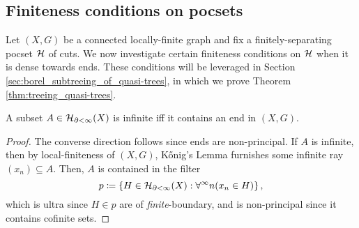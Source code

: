 \documentclass[reqno]{amsart}
\begin{document}
    \subsection{Finiteness conditions on pocsets}\label{sec:finiteness_conditions_on_pocsets_dense_cuts}

    Let $(X,G)$ be a connected locally-finite graph and fix a finitely-separating pocset $\mathcal{H}$ of cuts. We now investigate certain finiteness conditions on $\mathcal{H}$ when it is dense towards ends. These conditions will be leveraged in Section \ref{sec:borel_subtreeing_of_quasi-trees}, in which we prove Theorem \ref{thm:treeing_quasi-trees}.

    \begin{lemma}\label{lem:infinite_iff_contains_end}
        A subset $A\in\mathcal{H}_{\partial<\infty}(X)$ is infinite iff it contains an end in $(X,G)$.
    \end{lemma}
    \begin{proof}
        The converse direction follows since ends are non-principal. If $A$ is infinite, then by local-finiteness of $(X,G)$, K\H{o}nig's Lemma furnishes some infinite ray $(x_n)\subseteq A$. Then, $A$ is contained in the filter
        \begin{equation*}
            p\coloneqq\left\{H\in\mathcal{H}_{\partial<\infty}(X):\forall^\infty n(x_n\in H)\right\},
        \end{equation*}
        which is ultra since $H\in p$ are of \textit{finite}-boundary, and is non-principal since it contains cofinite sets.
    \end{proof}
\end{document}
